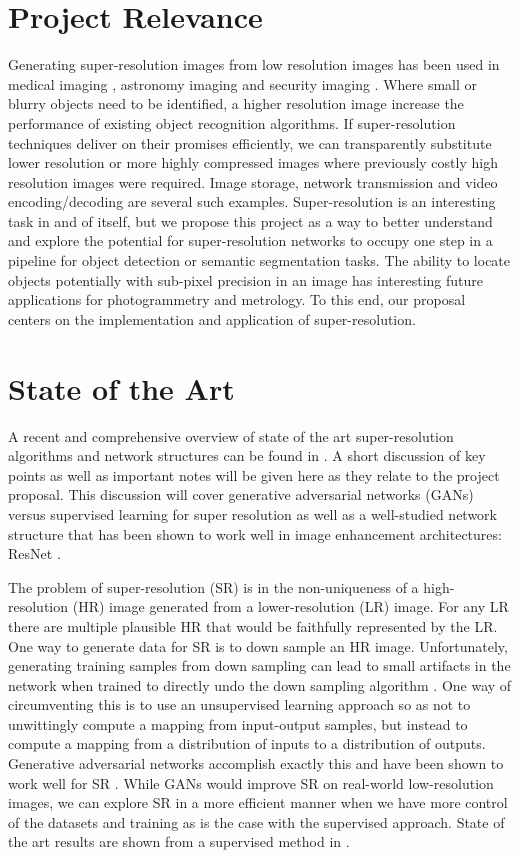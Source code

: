 \documentclass{article}
\begin{document}
\section{Project Relevance}
Generating super-resolution images from low resolution images has been used in medical imaging \cite{Pham2019, Georgescu2020}, astronomy imaging \cite{zhang2019} and security imaging \cite{yang2019deep}. Where small or blurry objects need to be identified, a higher resolution image increase the performance of existing object recognition algorithms. If super-resolution techniques deliver on their promises efficiently, we can transparently substitute lower resolution or more highly compressed images where previously costly high resolution images were required. Image storage, network transmission and video encoding/decoding  are several such examples. Super-resolution is an interesting task in and of itself, but we propose this project as a way to better understand and explore the potential for super-resolution networks to occupy one step in a pipeline for object detection or semantic segmentation tasks. The ability to locate objects potentially with sub-pixel precision in an image has interesting future applications for photogrammetry and metrology. To this end, our proposal centers on the implementation and application of super-resolution.


\section{State of the Art}
A recent and comprehensive overview of state of the art super-resolution algorithms and network structures can be found in \cite{yang2019deep}. A short discussion of key points as well as important notes will be given here as they relate to the project proposal. This discussion will cover generative adversarial networks (GANs) versus supervised learning for super resolution as well as a well-studied network structure that has been shown to work well in image enhancement architectures: ResNet \cite{he2016deep}.

The problem of super-resolution (SR) is in the non-uniqueness of a high-resolution (HR) image generated from a lower-resolution (LR) image. For any LR there are multiple plausible HR that would be faithfully represented by the LR. One way to generate data for SR is to down sample an HR image. Unfortunately, generating training samples from down sampling can lead to small artifacts in the network when trained to directly undo the down sampling algorithm \cite{yang2019deep}. One way of circumventing this is to use an unsupervised learning approach so as not to unwittingly compute a mapping from input-output samples, but instead to compute a mapping from a distribution of inputs to a distribution of outputs. Generative adversarial networks accomplish exactly this and have been shown to work well for SR \cite{ledig2017photo}. While GANs would improve SR on real-world low-resolution images, we can explore SR in a more efficient manner when we have more control of the datasets and training as is the case with the supervised approach. State of the art results are shown from a supervised method in \cite{lim2017enhanced}.
\end{document}
